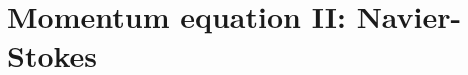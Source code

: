 \documentclass{article}
\begin{document}
\section{Momentum equation II: Navier-Stokes}

\end{document}
